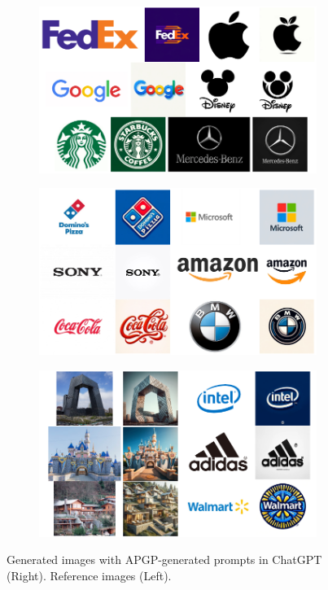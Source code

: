 \begin{figure}[ht]
    \centering
    \begin{subfigure}[t]{0.85\linewidth}
        \includegraphics[width=0.99\textwidth]{figure_folder/9.png}
    \end{subfigure}
    \hfill
    \begin{subfigure}[t]{0.85\linewidth}
        \includegraphics[width=0.99\textwidth]{figure_folder/10.png}
    \end{subfigure}
    \begin{subfigure}[t]{0.85\linewidth}
        \includegraphics[width=0.99\textwidth]{figure_folder/11.png}
  
    \end{subfigure}
    \caption{Generated images with APGP-generated prompts in ChatGPT (Right). Reference images (Left).}
    \label{app:final_output4}
\end{figure}

